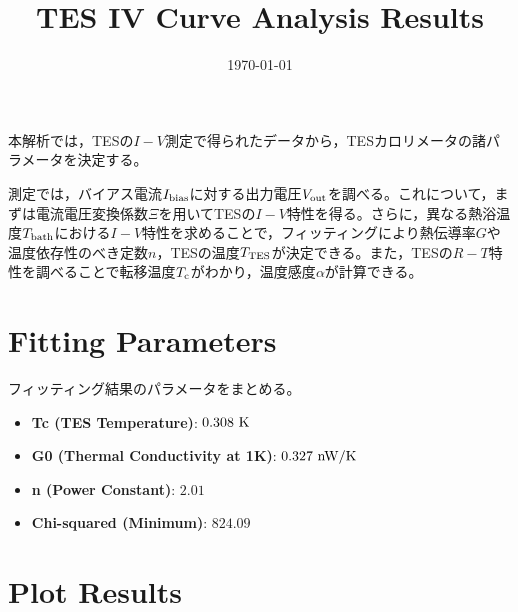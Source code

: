 \documentclass[platex,dvipdfmx,10pt,twoside,a4paper,jis2004]{jsarticle}
\title{TES IV Curve Analysis Results}
\author{}
\date{\today}
\begin{document}
\maketitle
本解析では，TESの$I-V$測定で得られたデータから，TESカロリメータの諸パラメータを決定する。
\par
測定では，バイアス電流$I_{\rm bias}$に対する出力電圧$V_{\rm out}$を調べる。これについて，まずは電流電圧変換係数$\Xi$を用いてTESの$I-V$特性を得る。さらに，異なる熱浴温度$T_{\rm bath}$における$I-V$特性を求めることで，フィッティングにより熱伝導率$G$や温度依存性のべき定数$n$，TESの温度$T_{\rm TES}$が決定できる。また，TESの$R-T$特性を調べることで転移温度$T_{\rm c}$がわかり，温度感度$\alpha$が計算できる。

\section*{Fitting Parameters}
フィッティング結果のパラメータをまとめる。
\begin{itemize}
    \item \textbf{Tc (TES Temperature)}: $0.308\ {\rm K}$
    \item \textbf{G0 (Thermal Conductivity at 1K)}: $0.327\ {\rm nW/K}$
    \item \textbf{n (Power Constant)}: $2.01$
    \item \textbf{Chi-squared (Minimum)}: $824.09$
\end{itemize}
\clearpage

\section*{Plot Results}
\end{document}
